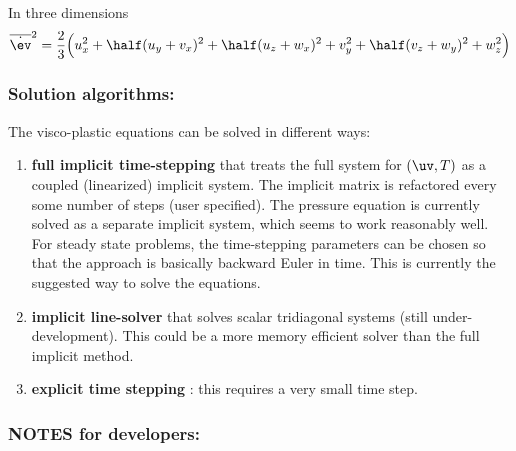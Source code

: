 In three dimensions
\begin{align*}
 \esr^2 &=  {2\over 3} \Big( u_x^2 +  \half( u_y + v_x )^2 +  \half( u_z + w_x )^2 + v_y^2 +  \half( v_z + w_y )^2 + w_z^2 \Big)  \\
\end{align*}


\subsubsection{\bf Solution algorithms:}

The visco-plastic equations can be solved in different ways:
\begin{enumerate}
  \item {\bf full implicit time-stepping} that treats the full system for $(\uv,T)$ as a coupled (linearized)
        implicit system. The implicit matrix is refactored every some number of steps (user specified).
        The pressure equation is currently solved as a separate implicit system, which seems to work reasonably
        well. 
        For steady state problems, the time-stepping parameters can be chosen so that the 
        approach is basically backward Euler in time.
        This is currently the suggested way to solve the equations. 
  \item {\bf implicit line-solver} that solves scalar tridiagonal systems (still under-development). This could be
        a more memory efficient solver than the full implicit method. 
  \item {\bf explicit time stepping} : this requires a very small time step. 
\end{enumerate}

\subsubsection{\bf NOTES for developers:}

